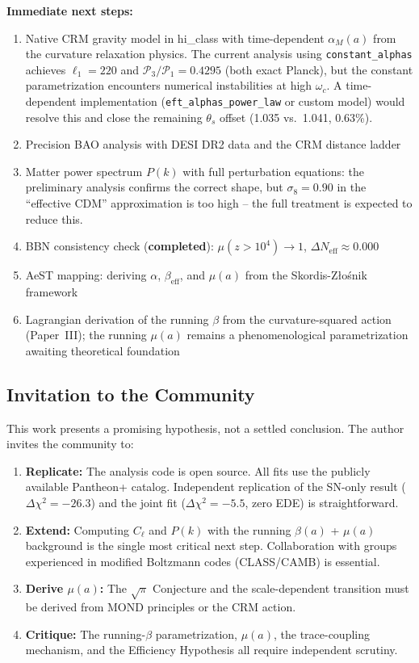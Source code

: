\documentclass[aps,prd,twocolumn,superscriptaddress,nofootinbib]{revtex4-2}
\begin{document}
\textbf{Immediate next steps:}
\begin{enumerate}
\item Native CRM gravity model in hi\_class with time-dependent $\alpha_M(a)$ from the curvature relaxation physics. The current analysis using \texttt{constant\_alphas} achieves $\ell_1 = 220$ and $\mathcal{P}_3/\mathcal{P}_1 = 0.4295$ (both exact Planck), but the constant parametrization encounters numerical instabilities at high $\omega_c$. A time-dependent implementation (\texttt{eft\_alphas\_power\_law} or custom model) would resolve this and close the remaining $\theta_s$ offset (1.035 vs.\ 1.041, 0.63\%).
\item Precision BAO analysis with DESI DR2 data and the CRM distance ladder
\item Matter power spectrum $P(k)$ with full perturbation equations: the preliminary analysis confirms the correct shape, but $\sigma_8 = 0.90$ in the ``effective CDM'' approximation is too high -- the full treatment is expected to reduce this.
\item BBN consistency check (\textbf{completed}): $\mu(z > 10^4) \to 1$, $\Delta N_{\mathrm{eff}} \approx 0.000$ \cite{Pitrou2018}
\item AeST mapping: deriving $\alpha$, $\beta_{\mathrm{eff}}$, and $\mu(a)$ from the Skordis-Z{\l}o\'snik framework
\item Lagrangian derivation of the running $\beta$ from the curvature-squared action (Paper~III); the running $\mu(a)$ remains a phenomenological parametrization awaiting theoretical foundation
\end{enumerate}

\subsection{Invitation to the Community}

This work presents a promising hypothesis, not a settled conclusion. The author invites the community to:
\begin{enumerate}
\item \textbf{Replicate:} The analysis code is open source. All fits use the publicly available Pantheon+ catalog. Independent replication of the SN-only result ($\Delta\chi^2 = -26.3$) and the joint fit ($\Delta\chi^2 = -5.5$, zero EDE) is straightforward.
\item \textbf{Extend:} Computing $C_\ell$ and $P(k)$ with the running $\beta(a)$ + $\mu(a)$ background is the single most critical next step. Collaboration with groups experienced in modified Boltzmann codes (CLASS/CAMB) is essential.
\item \textbf{Derive $\mu(a)$:} The $\sqrt{\pi}$ Conjecture and the scale-dependent transition must be derived from MOND principles or the CRM action.
\item \textbf{Critique:} The running-$\beta$ parametrization, $\mu(a)$, the trace-coupling mechanism, and the Efficiency Hypothesis all require independent scrutiny.
\end{enumerate}
\end{document}
